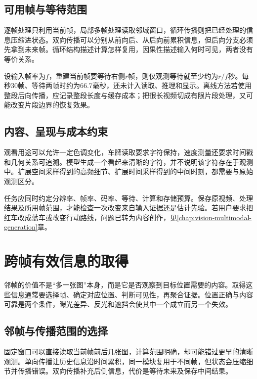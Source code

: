 \subsection{可用帧与等待范围}
\label{sec:vision-video-restoration-availability}

逐帧处理只利用当前帧，局部多帧处理读取邻域窗口，循环传播则把已经处理的信息压缩进状态。双向传播可以分别从前向后、从后向前累积信息，但后向分支必须先拿到未来帧。循环结构描述计算怎样复用，因果性描述输入何时可见，两者没有等价关系。

设输入帧率为$f$，重建当前帧要等待右侧$r$帧，则仅观测等待就至少约为$r/f$秒。每秒30帧、等待两帧时约为66.7毫秒，还未计入读取、推理和显示。离线方法若使用整段后向传播，应记录整段长度与缓存成本；把很长视频切成有限片段处理，又可能改变片段边界的恢复效果。

\subsection{内容、呈现与成本约束}
\label{sec:vision-video-content-cost}

观看用途可以允许一定色调变化，车牌读取要求字符保持，速度测量还要求时间戳和几何关系可追溯。模型生成一个看起来清晰的字符，并不说明该字符存在于观测中。扩展空间采样得到的高频细节、扩展时间采样得到的中间时刻，都需要与原始观测区分。

任务应同时约定分辨率、帧率、码率、等待、计算和存储预算。保存原视频、处理结果及所用帧范围，才能检查一次改变来自输入证据还是估计先验。若用户要求把红车改成蓝车或改变行动路线，问题已转为内容创作，见\ref{chap:vision-multimodal-generation}章。

\section{跨帧有效信息的取得}
\label{sec:vision-video-information-fusion}

邻帧的价值不是“多一张图”本身，而是它是否观察到目标位置需要的内容。取得这些信息通常要选择帧、确定对应位置、判断可见性，再聚合证据。位置正确与内容可靠是两个条件，曝光差异、反光和遮挡会使其中一个成立而另一个失效。

\subsection{邻帧与传播范围的选择}
\label{sec:vision-video-neighbor-selection}

固定窗口可以直接读取当前帧前后几张图，计算范围明确，却可能错过更早的清晰观测。单向传播让历史信息沿时间累积，同一模块复用于不同帧，但状态会压缩细节并传播错误。双向传播补充后侧信息，代价是等待未来及保存中间结果。

